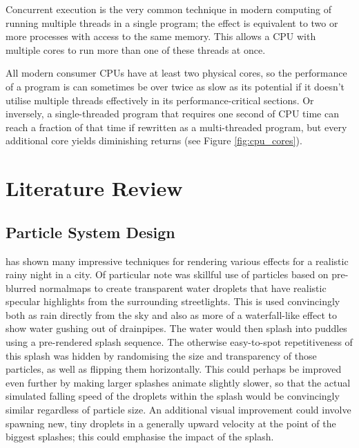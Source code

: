 \documentclass[11pt, a4paper, twocolumn]{article}
\begin{document}
Concurrent execution is the very common technique in modern computing of running multiple threads in a single program; the effect is equivalent to two or more processes with access to the same memory. This allows a CPU with multiple cores to run more than one of these threads at once.

All modern consumer CPUs have at least two physical cores, so the performance of a program is can sometimes be over twice as slow as its potential if it doesn't utilise multiple threads effectively in its performance-critical sections. Or inversely, a single-threaded program that requires one second of CPU time can reach a fraction of that time if rewritten as a multi-threaded program, but every additional core yields diminishing returns (see Figure \ref{fig:cpu_cores}). %

\section{Literature Review}


\subsection{Particle System Design}
\citet{Tatarchuk2006} has shown many impressive techniques for rendering various effects for a realistic rainy night in a city. Of particular note was skillful use of particles based on pre-blurred normalmaps to create transparent water droplets that have realistic specular highlights from the surrounding streetlights. This is used convincingly both as rain directly from the sky and also as more of a waterfall-like effect to show water gushing out of drainpipes. The water would then splash into puddles using a pre-rendered splash sequence. The otherwise easy-to-spot repetitiveness of this splash was hidden by randomising the size and transparency of those particles, as well as flipping them horizontally. This could perhaps be improved even further by making larger splashes animate slightly slower, so that the actual simulated falling speed of the droplets within the splash would be convincingly similar regardless of particle size. An additional visual improvement could involve spawning new, tiny droplets in a generally upward velocity at the point of the biggest splashes; this could emphasise the impact of the splash. %
\end{document}
